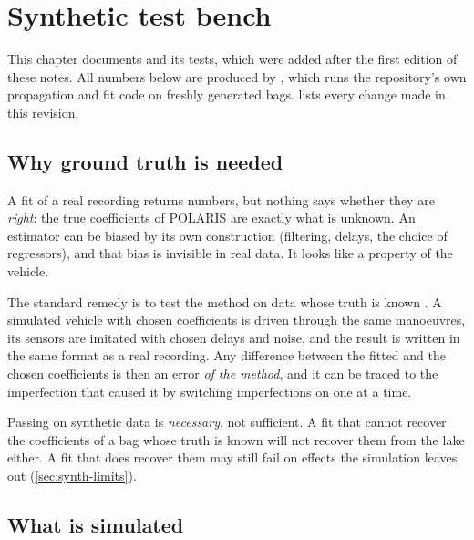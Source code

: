 \chapter{Synthetic test bench}
\label{ch:synthetic}

\begin{revised}[title={New chapter, added 14 October 2026}]
This chapter documents  and its tests, which were
added after the first edition of these notes. All numbers below are produced by
, which runs the repository's own propagation and fit
code on freshly generated bags.  lists every change made in this revision.
\end{revised}

\section{Why ground truth is needed}

A fit of a real recording returns numbers, but nothing says whether they are \emph{right}: the
true coefficients of POLARIS are exactly what is unknown. An estimator can be biased by its
own construction (filtering, delays, the choice of regressors), and that bias is invisible in
real data. It looks like a property of the vehicle.

The standard remedy is to test the method on data whose truth is known
\cite{ljung1999,klein2006}. A simulated vehicle with chosen coefficients is driven through the
same manoeuvres, its sensors are imitated with chosen delays and noise, and the result is
written in the same format as a real recording. Any difference between the fitted and the
chosen coefficients is then an error \emph{of the method}, and it can be traced to the
imperfection that caused it by switching imperfections on one at a time.

\begin{keyidea}
Passing on synthetic data is \emph{necessary}, not sufficient. A fit that cannot recover the
coefficients of a bag whose truth is known will not recover them from the lake either. A fit
that does recover them may still fail on effects the simulation leaves out (\cref{sec:synth-limits}).
\end{keyidea}

\section{What is simulated}


